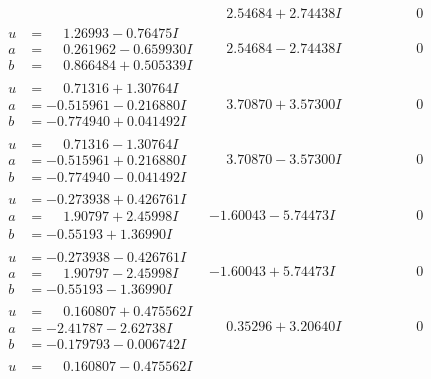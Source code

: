 \documentclass[1p]{elsarticle_modified}
\theoremstyle{definition}
\begin{document}
$$\begin{array}{c|c|c}
 & \phantom{-}2.54684 + 2.74438 I & \phantom{-0.000000 } 0 \\ \hline\begin{aligned}
u &= \phantom{-}1.26993 - 0.76475 I \\
a &= \phantom{-}0.261962 - 0.659930 I \\
b &= \phantom{-}0.866484 + 0.505339 I\end{aligned}
 & \phantom{-}2.54684 - 2.74438 I & \phantom{-0.000000 } 0 \\ \hline\begin{aligned}
u &= \phantom{-}0.71316 + 1.30764 I \\
a &= -0.515961 - 0.216880 I \\
b &= -0.774940 + 0.041492 I\end{aligned}
 & \phantom{-}3.70870 + 3.57300 I & \phantom{-0.000000 } 0 \\ \hline\begin{aligned}
u &= \phantom{-}0.71316 - 1.30764 I \\
a &= -0.515961 + 0.216880 I \\
b &= -0.774940 - 0.041492 I\end{aligned}
 & \phantom{-}3.70870 - 3.57300 I & \phantom{-0.000000 } 0 \\ \hline\begin{aligned}
u &= -0.273938 + 0.426761 I \\
a &= \phantom{-}1.90797 + 2.45998 I \\
b &= -0.55193 + 1.36990 I\end{aligned}
 & -1.60043 - 5.74473 I & \phantom{-0.000000 } 0 \\ \hline\begin{aligned}
u &= -0.273938 - 0.426761 I \\
a &= \phantom{-}1.90797 - 2.45998 I \\
b &= -0.55193 - 1.36990 I\end{aligned}
 & -1.60043 + 5.74473 I & \phantom{-0.000000 } 0 \\ \hline\begin{aligned}
u &= \phantom{-}0.160807 + 0.475562 I \\
a &= -2.41787 - 2.62738 I \\
b &= -0.179793 - 0.006742 I\end{aligned}
 & \phantom{-}0.35296 + 3.20640 I & \phantom{-0.000000 } 0 \\ \hline\begin{aligned}
u &= \phantom{-}0.160807 - 0.475562 I \\

\end{aligned}
\end{array}$$
\end{document}
